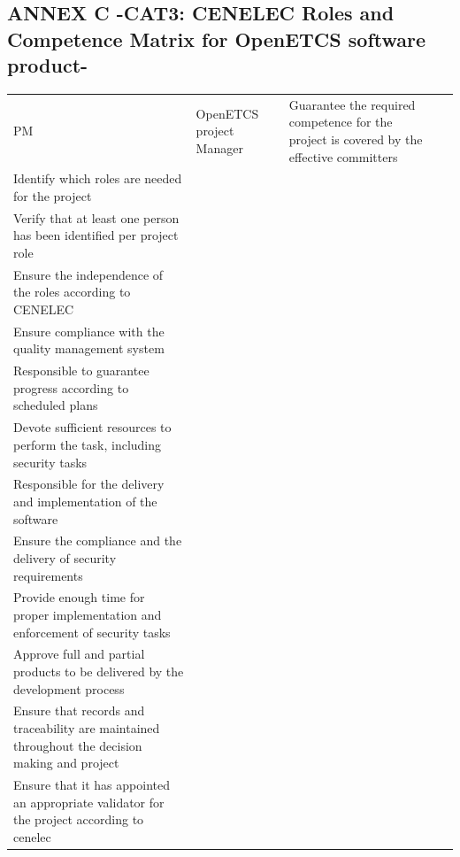 \documentclass{template/openetcs_article}
\begin{document}
\begin{landscape}
\newpage
\subsection{ANNEX C -CAT3: CENELEC Roles and Competence Matrix for OpenETCS software product-}

\begin{flushleft}
\begin{supertabular}[H]{|m{1cm}|m{2,5cm}|m{15cm}|m{6cm}|}
\hline
PM &
OpenETCS project Manager &
\raggedright
Guarantee the required competence for the project is covered by the effective committers\\
Identify which roles are needed for the project\\
Verify that at least one person has been identified per project role\\
Ensure the independence of the roles according to CENELEC\\
Ensure compliance with the quality management system\\
Responsible to guarantee progress according to scheduled plans\\
Devote sufficient resources to perform the task, including security tasks\\
Responsible for the delivery and implementation of the software\\
Ensure the compliance and the delivery of security requirements\\
Provide enough time for proper implementation and enforcement of security tasks\\
Approve full and partial products to be delivered by the development process\\
Ensure that records and traceability are maintained throughout the decision making and project\\
Ensure that it has appointed an appropriate validator for the project according to cenelec

\end{supertabular}
\end{flushleft}
\end{landscape}
\end{document}
